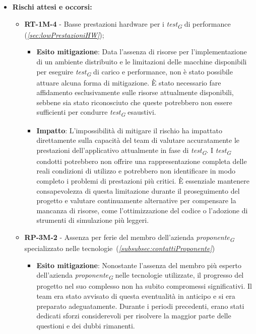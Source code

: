 \begin{itemize}
    \item \textbf{Rischi attesi e occorsi:}
        \begin{itemize}
            \item \textbf{RT-1M-4} - Basse prestazioni hardware per i \textit{test}\textsubscript{\textit{G}} di performance (\textit{\ref{sec:lowPrestazioniHW}});
            \begin{itemize}
                \item \textbf{Esito mitigazione}: Data l'assenza di risorse per l'implementazione di un ambiente distribuito e le limitazioni delle macchine disponibili per eseguire \textit{test}\textsubscript{\textit{G}} di carico e performance, non è stato possibile attuare alcuna forma di mitigazione. È stato necessario fare affidamento esclusivamente sulle risorse attualmente disponibili, sebbene sia stato riconosciuto che queste potrebbero non essere sufficienti per condurre \textit{test}\textsubscript{\textit{G}} esaustivi.
                \item \textbf{Impatto}: L'impossibilità di mitigare il rischio ha impattato direttamente sulla capacità del team di valutare accuratamente le prestazioni dell'applicativo attualmente in fase di \textit{test}\textsubscript{\textit{G}}. I \textit{test}\textsubscript{\textit{G}} condotti potrebbero non offrire una rappresentazione completa delle reali condizioni di utilizzo e potrebbero non identificare in modo completo i problemi di prestazioni più critici. È essenziale mantenere consapevolezza di questa limitazione durante il proseguimento del progetto e valutare continuamente alternative per compensare la mancanza di risorse, come l'ottimizzazione del codice o l'adozione di strumenti di simulazione più leggeri.
            \end{itemize}
            \item \textbf{RP-3M-2} - Assenza per ferie del membro dell'azienda \textit{proponente}\textsubscript{\textit{G}} specializzato nelle tecnologie~(\textit{\ref{subsubsec:contattiProponente}})
                \begin{itemize}
                    \item \textbf{Esito mitigazione}: Nonostante l'assenza del membro più esperto dell'azienda \textit{proponente}\textsubscript{\textit{G}} nelle tecnologie utilizzate, il progresso del progetto nel suo complesso non ha subito compromessi significativi. Il team era stato avvisato di questa eventualità in anticipo e si era preparato adeguatamente. Durante i periodi precedenti, erano stati dedicati sforzi considerevoli per risolvere la maggior parte delle questioni e dei dubbi rimanenti.

\end{itemize}
\end{itemize}
\end{itemize}
